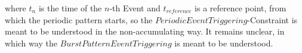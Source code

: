 where $t_n$ is the time of the $n$-th Event and $t_{reference}$ is a reference point, from which the periodic pattern starts, so the $PeriodicEventTriggering$-Constraint is meant to be understood in the non-accumulating way. It remains unclear, in which way the $BurstPatternEventTriggering$ is meant to be understood.



 




